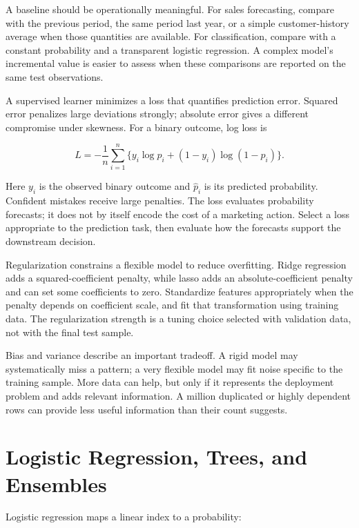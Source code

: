 \noindent A baseline should be operationally meaningful. For sales forecasting,
compare with the previous period, the same period last year, or a simple
customer-history average when those quantities are available. For
classification, compare with a constant probability and a transparent
logistic regression. A complex model's incremental value is easier to
assess when these comparisons are reported on the same test
observations.

A supervised learner minimizes a loss that quantifies prediction error.
Squared error penalizes large deviations strongly; absolute error gives
a different compromise under skewness. For a binary outcome, log loss is

\[
L=-\frac{1}{n}\sum_{i=1}^n\{y_i\log\hat p_i+(1-y_i)\log(1-\hat p_i)\}.
\]

Here \(y_i\) is the observed binary outcome and \(\hat p_i\) is its
predicted probability. Confident mistakes receive large penalties. The
loss evaluates probability forecasts; it does not by itself encode the
cost of a marketing action. Select a loss appropriate to the prediction
task, then evaluate how the forecasts support the downstream decision.

Regularization constrains a flexible model to reduce overfitting. Ridge
regression adds a squared-coefficient penalty, while lasso adds an
absolute-coefficient penalty and can set some coefficients to zero.
Standardize features appropriately when the penalty depends on
coefficient scale, and fit that transformation using training data. The
regularization strength is a tuning choice selected with validation
data, not with the final test sample.

Bias and variance describe an important tradeoff. A rigid model may
systematically miss a pattern; a very flexible model may fit noise
specific to the training sample. More data can help, but only if it
represents the deployment problem and adds relevant information. A
million duplicated or highly dependent rows can provide less useful
information than their count suggests.

\hypertarget{M07-logistic-regression-trees-and-ensembles}{%
\section{Logistic Regression, Trees, and
Ensembles}\label{M07-logistic-regression-trees-and-ensembles}}

\noindent Logistic regression maps a linear index to a probability:

